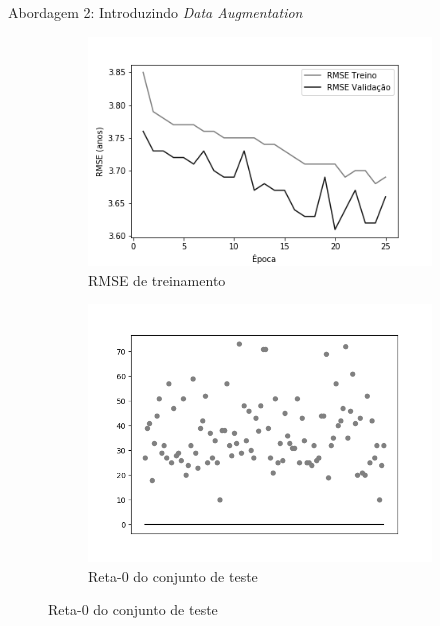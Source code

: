 \begin{frame}{\large{Abordagem 2: Introduzindo \emph{Data Augmentation}}}
  \begin{figure}[h!]
    \caption{Resultados do treinamento e teste da CNN LeNet \emph{Leaky ReLU}}
  \begin{subfigure}[hb]{0.4\textwidth}
    \caption{RMSE de treinamento}
    \includegraphics[width=\linewidth]{img/graficos/history/lenet/fig-history-image-treat-2-lenet-lrelu-rmse.png}
  \end{subfigure}
  \begin{subfigure}[hb]{0.4\textwidth}
    \caption{Reta-0 do conjunto de teste}
   \includegraphics[width=\linewidth]{img/graficos/reta0/lenet/fig-reta-0-image-treat-2-lenet-lrelu.png}
  \end{subfigure}%
\end{figure}
\end{frame}

